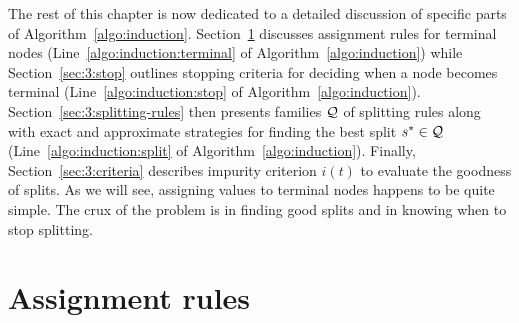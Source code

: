 
The rest of this chapter is now dedicated to a detailed discussion of specific
parts of Algorithm~\ref{algo:induction}. Section~\ref{sec:3:assignment}
discusses assignment rules for terminal nodes
(Line~\ref{algo:induction:terminal} of Algorithm~\ref{algo:induction}) while
Section~\ref{sec:3:stop} outlines stopping criteria for deciding when a node
becomes terminal (Line~\ref{algo:induction:stop} of
Algorithm~\ref{algo:induction}). Section~\ref{sec:3:splitting-rules} then
presents families ${\cal Q}$ of splitting rules along with exact and
approximate strategies for finding the best split $s^* \in {\cal Q}$
(Line~\ref{algo:induction:split} of Algorithm~\ref{algo:induction}). Finally,
Section~\ref{sec:3:criteria} describes  impurity criterion $i(t)$ to evaluate
the goodness of splits. As we will see, assigning values to terminal
nodes happens to be quite simple. The crux of the problem is in finding good
splits and in knowing when to stop splitting.


\section{Assignment rules}
\label{sec:3:assignment}

